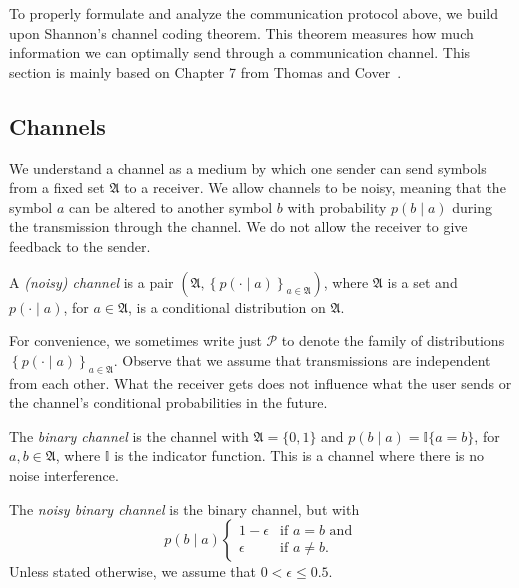 To properly formulate and analyze the communication protocol above, we build upon Shannon's channel coding theorem. This theorem measures how much information we can optimally send through a communication channel. This section is mainly based on Chapter 7 from Thomas and Cover~\cite{infotheory}.

\subsection{Channels}

We understand a channel as a medium by which one sender can send symbols from a fixed set $\mathfrak{A}$ to a receiver. We allow channels to be noisy, meaning that the symbol $a$ can be altered to another symbol $b$ with probability $p(b \mid a)$ during the transmission through the channel. We do not allow the receiver to give feedback to the sender.

\begin{definition} A \emph{(noisy) channel} is a pair $\left(\mathfrak{A}, \left\{p(\cdot \mid a)\right\}_{a \in \mathfrak{A}}\right)$, where $\mathfrak{A}$ is a set and $p(\cdot \mid a)$, for $a \in \mathfrak{A}$, is a conditional distribution on $\mathfrak{A}$.
\label{def:channel}
\end{definition}

For convenience, we sometimes write just $\mathcal{P}$ to denote the family of distributions $\left\{p(\cdot \mid a)\right\}_{a \in \mathfrak{A}}$. Observe that we assume that transmissions are independent from each other. What the receiver gets does not influence what the user sends or the channel's conditional probabilities in the future.
%

\begin{example}
The \emph{binary channel} is the channel with $\mathfrak{A} = \{0, 1\}$ and $p(b \mid a) = \mathbb{I}\{a=b\}$, for $a, b \in \mathfrak{A}$, where $\mathbb{I}$ is the indicator function. This is a channel where there is no noise interference.
\end{example}

\begin{example}
The \emph{noisy binary channel} is the binary channel, but with 
%
$$p(b \mid a) 
\begin{cases}
1 - \epsilon & \text{if $a = b$ and}\\
\epsilon & \text{if $a \neq b$.}
\end{cases}
$$
%
Unless stated otherwise, we assume that $0 < \epsilon \leq 0.5$.
\end{example}

